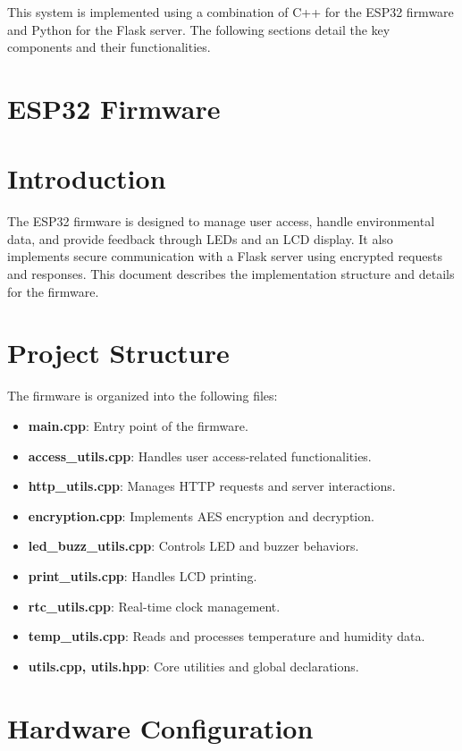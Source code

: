 \documentclass[a4paper,12pt]{report}
\begin{document}
This system is implemented using a combination of C++ for the ESP32 firmware and Python for the Flask server. The following sections detail the key components and their functionalities.

\section{ESP32 Firmware}

\section{Introduction}
The ESP32 firmware is designed to manage user access, handle environmental data, and provide feedback through LEDs and an LCD display. It also implements secure communication with a Flask server using encrypted requests and responses. This document describes the implementation structure and details for the firmware.

\section{Project Structure}
The firmware is organized into the following files:

\begin{itemize}
    \item \textbf{main.cpp}: Entry point of the firmware.
    \item \textbf{access\_utils.cpp}: Handles user access-related functionalities.
    \item \textbf{http\_utils.cpp}: Manages HTTP requests and server interactions.
    \item \textbf{encryption.cpp}: Implements AES encryption and decryption.
    \item \textbf{led\_buzz\_utils.cpp}: Controls LED and buzzer behaviors.
    \item \textbf{print\_utils.cpp}: Handles LCD printing.
    \item \textbf{rtc\_utils.cpp}: Real-time clock management.
    \item \textbf{temp\_utils.cpp}: Reads and processes temperature and humidity data.
    \item \textbf{utils.cpp, utils.hpp}: Core utilities and global declarations.
\end{itemize}

\section{Hardware Configuration}
\end{document}
